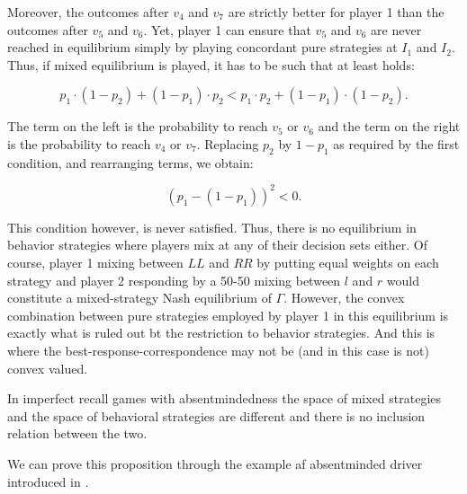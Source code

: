 \begin{example}
\noindent
Moreover, the outcomes after $v_4$ and $v_7$ are strictly better for player 1 than the outcomes after $v_5$ and $v_6$. Yet, player 1 can ensure that $v_5$ and $v_6$ are never reached in equilibrium simply by playing concordant pure strategies at $I_1$ and $I_2$. Thus, if mixed equilibrium is played, it has to be such that at least holds: 

\begin{equation}
p_1 \cdot (1-p_2) + (1-p_1) \cdot p_2 < p_1 \cdot p_2 + (1-p_1) \cdot (1-p_2).
\end{equation}

\noindent
The term on the left is the probability to reach $v_5$ or $v_6$ and the term on the right is the probability to reach $v_4$ or $v_7$. Replacing $p_2$ by $1-p_1$ as required by the first condition, and rearranging terms, we obtain: 

\begin{equation}
( p_1 - (1 - p_1)) ^2 < 0.
\end{equation}

\noindent
This condition however, is never satisfied. Thus, there is no equilibrium in behavior strategies where players mix at any of their decision sets either. 
Of course, player 1 mixing between $LL$ and $RR$ by putting equal weights on each strategy and player 2 responding by a 50-50 mixing between $l$ and $r$ would constitute a mixed-strategy Nash equilibrium of $\Gamma$. However, the convex combination between pure strategies employed by player 1 in this equilibrium is exactly what is ruled out bt the restriction to behavior strategies. And this is where the best-response-correspondence may not be (and in this case is not) convex valued. \\

\end{example}




\begin{prop}\label{propD}
	In imperfect recall games with absentmindedness the space of mixed strategies and the space of behavioral strategies are different and there is no inclusion relation between the two.
\end{prop}

We can prove this proposition through the example af absentminded driver introduced in \citep{piccione1997}. \\

